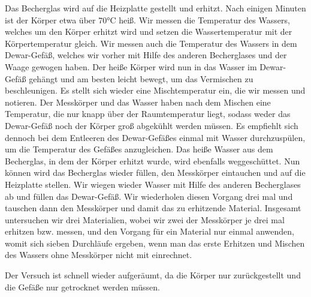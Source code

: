 Das Becherglas wird auf die Heizplatte gestellt und erhitzt. Nach einigen Minuten ist der Körper etwa über $70\si{\celsius}$ heiß.
Wir messen die Temperatur des Wassers, welches um den Körper erhitzt wird und setzen die Wassertemperatur mit der Körpertemperatur gleich.
Wir messen auch die Temperatur des Wassers in dem Dewar-Gefäß, welches wir vorher mit Hilfe des anderen Becherglases und der Waage gewogen haben.
Der heiße Körper wird nun in das Wasser im Dewar-Gefäß gehängt und am besten leicht bewegt, um das Vermischen zu beschleunigen.
Es stellt sich wieder eine Mischtemperatur ein, die wir messen und notieren. Der Messkörper und das Wasser haben nach dem Mischen eine Temperatur,
die nur knapp über der Raumtemperatur liegt, sodass weder das Dewar-Gefäß noch der Körper groß abgekühlt werden müssen.
Es empfiehlt sich dennoch bei dem Entleeren des Dewar-Gefäßes einmal mit Wasser durchzuspülen, um die Temperatur des Gefäßes anzugleichen.
Das heiße Wasser aus dem Becherglas, in dem der Körper erhitzt wurde, wird ebenfalls weggeschüttet.
Nun können wird das Becherglas wieder füllen, den Messkörper eintauchen und auf die Heizplatte stellen.
Wir wiegen wieder Wasser mit Hilfe des anderen Becherglases ab und füllen das Dewar-Gefäß.
Wir wiederholen diesen Vorgang drei mal und tauschen dann den Messkörper und damit das zu erhitzende Material.
Insgesamt untersuchen wir drei Materialien, wobei wir zwei der Messkörper je drei mal erhitzen bzw. messen, und den Vorgang für ein Material nur 
einmal anwenden, womit sich sieben Durchläufe ergeben, wenn man das erste Erhitzen und Mischen des Wassers ohne Messkörper nicht mit einrechnet.

Der Versuch ist schnell wieder aufgeräumt, da die Körper nur zurückgestellt und die Gefäße nur getrocknet werden müssen.
\pagebreak